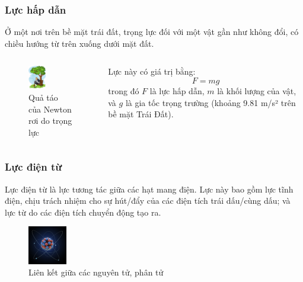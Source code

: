 \begin{frame}
    \frametitle{Lực hấp dẫn}
    Ở một nơi trên bề mặt trái đất, trọng lực đối với một vật gần như không đổi, có chiều hướng từ trên xuống dưới mặt đất.
    \begin{columns}
    \begin{column}{0.5\textwidth}
        \begin{figure}
        \centering
        \includegraphics[width=0.4\textwidth,keepaspectratio]{Slides/Figure/applefalling.jpg}
        \caption{Quả táo của Newton rơi do trọng lực}
        \end{figure}
    \end{column}
    \begin{column}{0.5\textwidth}
        Lực này có giá trị bằng:
        \begin{equation}
            F=mg
        \end{equation}
        trong đó \(F\) là lực hấp dẫn, \(m\) là khối lượng của vật, và \(g\) là gia tốc trọng trường (khoảng 9.81 m/s² trên bề mặt Trái Đất).
    \end{column}
    \end{columns}
\end{frame}

\begin{frame}
\frametitle{Lực điện từ}
\begin{tcolorbox}[colback=blue!10, colframe=blue!50!black, title=Định nghĩa]
Lực điện từ là lực tương tác giữa các hạt mang điện. Lực này bao gồm lực tĩnh điện, chịu trách nhiệm cho sự hút/đẩy của các điện tích trái dấu/cùng dấu; và lực từ do các điện tích chuyển động tạo ra.
\end{tcolorbox}
\begin{figure}
\centering
\includegraphics[width=0.15\textwidth]{Slides/Figure/atom.jpg}
\caption{Liên kết giữa các nguyên tử, phân tử}
\end{figure}
\end{frame}

